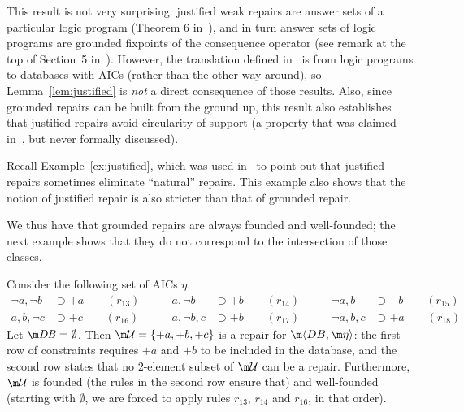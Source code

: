 {This result is not very surprising: justified weak repairs are answer sets of a particular logic program (Theorem 6 in~\cite{Caroprese2011}), and in turn answer sets of logic programs are grounded fixpoints of the consequence operator (see remark at the top of Section~5 in~).
However, the translation defined in~\cite{Caroprese2011} is from logic programs to databases with AICs (rather than the other way around), so Lemma~\ref{lem:justified} is \emph{not} a direct consequence of those results.
Also, since grounded repairs can be built from the ground up, this result also establishes that justified repairs avoid circularity of support (a property that was claimed in~\cite{Caroprese2011}, but never formally discussed).

Recall Example~\ref{ex:justified}, which was used in~\cite{CEGN13} to point out that justified repairs sometimes eliminate ``natural'' repairs.
This example also shows that the notion of justified repair is also stricter than that of grounded repair.

We thus have that grounded repairs are always founded and well-founded; the next example shows that they do not correspond to the intersection of those classes.

\begin{example}
  Consider the following set of AICs $\eta$.
  \begin{align*}
    \neg a,\neg b&\supset{+a} \qquad (r_{13}) \qquad &
    a,\neg b&\supset{+b} \qquad (r_{14}) \qquad &
    \neg a,b&\supset{-b} \qquad (r_{15}) \\
    a,b,\neg c&\supset{+c} \qquad (r_{16}) \qquad &
    a,\neg b,c&\supset{+b} \qquad (r_{17}) \qquad &
    \neg a,b,c&\supset{+a}\qquad (r_{18})
  \end{align*}
  Let $\db=\emptyset$.
  Then $\UU=\{{+a},{+b},{+c}\}$ is a repair for $\fulldb$: the first row of constraints requires ${+a}$ and ${+b}$ to be included in the database, and the second row states that no $2$-element subset of $\UU$ can be a repair.
  Furthermore, $\UU$ is founded (the rules in the second row ensure that) and well-founded (starting with $\emptyset$, we are forced to apply rules $r_{13}$, $r_{14}$ and $r_{16}$, in that order).


\end{example}}
